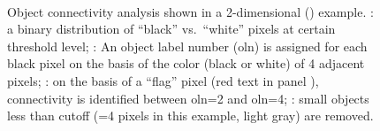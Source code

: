 \def\scale{0.5}
\begin{figure}
	\centering
	\noindent\makebox[\textwidth]{%
		\subfloat[]{%
			\label{subfig:tsuda-03a}%
		}%
		\subfloat[]{%
			\label{subfig:tsuda-03b}%
		}%
	}\\%
	\noindent\makebox[\textwidth]{%
		\subfloat[]{%
			\label{subfig:tsuda-03c}%
		}%
		\subfloat[]{%
			\label{subfig:tsuda-03d}%
		}%
	}%
	\caption[Object connectivity analysis]{Object connectivity analysis shown in a 2-dimensional (\twod) example. : a binary distribution of ``black'' vs.\ ``white'' pixels at certain threshold level; : An object label number (\acs{oln}) is assigned for each black pixel on the basis of the color (black or white) of 4 adjacent pixels; : on the basis of a ``flag'' pixel (red text in panel ), connectivity is identified between \ac{oln}=2 and \ac{oln}=4; : small objects less than cutoff (=4 pixels in this example, light gray) are removed.}
	\label{fig:tsuda-03}
\end{figure}

